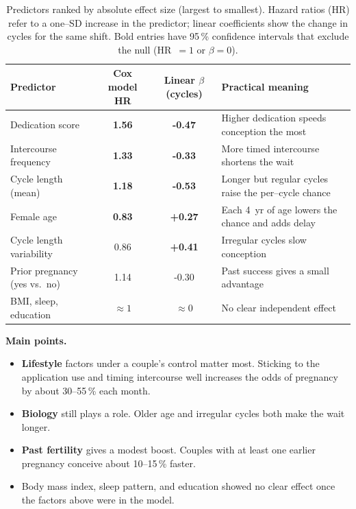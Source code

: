 \documentclass[11pt,a4paper]{article}
\begin{document}
\FloatBarrier
\begin{table}[htbp]
\small
\centering
\caption{Predictors ranked by absolute effect size (largest to smallest). Hazard ratios (HR) refer to a one--SD increase in the predictor; linear coefficients show the change in cycles for the same shift. Bold entries have 95\,\% confidence intervals that exclude the null (HR~$=1$ or $\beta=0$).}
\label{tab:effects}
\begin{tabularx}{\linewidth}{lccX}  %
\toprule
\textbf{Predictor} & \textbf{Cox model HR} & \textbf{Linear $\beta$ (cycles)} & \textbf{Practical meaning} \\
\midrule
Dedication score & \textbf{1.56} & \textbf{-0.47} & Higher dedication speeds conception the most \\
Intercourse frequency & \textbf{1.33} & \textbf{-0.33} & More timed intercourse shortens the wait \\
Cycle length (mean) & \textbf{1.18} & \textbf{-0.53} & Longer but regular cycles raise the per--cycle chance \\
Female age & \textbf{0.83} & \textbf{+0.27} & Each 4~yr of age lowers the chance and adds delay \\
Cycle length variability & 0.86 & \textbf{+0.41} & Irregular cycles slow conception \\
Prior pregnancy (yes vs.~no) & 1.14 & -0.30 & Past success gives a small advantage \\
BMI, sleep, education & $\approx1$ & $\approx0$ & No clear independent effect \\
\bottomrule
\end{tabularx}
\end{table}



\textbf{Main points.}
\begin{itemize}
  \item \textbf{Lifestyle} factors under a couple's control matter most. Sticking to the application use and timing intercourse well increases the odds of pregnancy by about 30--55\,\% each month.
  \item \textbf{Biology} still plays a role. Older age and irregular cycles both make the wait longer.
  \item \textbf{Past fertility} gives a modest boost. Couples with at least one earlier pregnancy conceive about 10--15\,\% faster.
  \item Body mass index, sleep pattern, and education showed no clear effect once the factors above were in the model.
\end{itemize}
\end{document}
